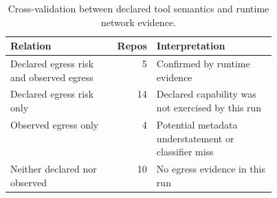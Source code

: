 \begin{table}[t]
\centering
\caption{Cross-validation between declared tool semantics and runtime network evidence.}
\label{tab:semantic-cross-validation}
\begin{tabular}{lrp{0.45\linewidth}}
\toprule
Relation & Repos & Interpretation \\
\midrule
Declared egress risk and observed egress & 5 & Confirmed by runtime evidence \\
Declared egress risk only & 14 & Declared capability was not exercised by this run \\
Observed egress only & 4 & Potential metadata understatement or classifier miss \\
Neither declared nor observed & 10 & No egress evidence in this run \\
\bottomrule
\end{tabular}
\end{table}
